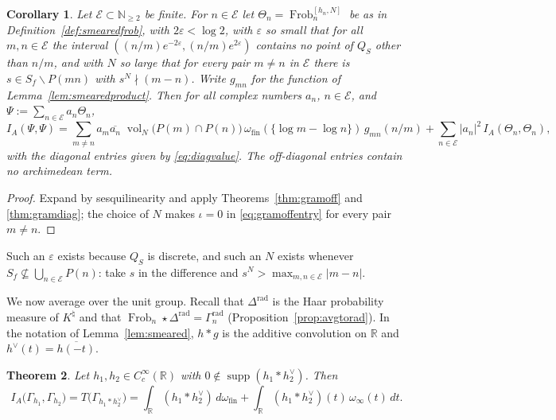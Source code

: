 \documentclass[11pt]{amsart}
\newtheorem{theorem}{Theorem}[section]
\newtheorem{corollary}[theorem]{Corollary}
\theoremstyle{definition}
\newcommand{\R}{\mathbb R}
\newcommand{\N}{\mathbb N}
\newcommand{\Frob}{\operatorname{Frob}}
\newcommand{\supp}{\operatorname{supp}}
\newcommand{\vol}{\operatorname{vol}}
\newcommand{\Knat}{K^{\natural}}
\begin{document}
\begin{corollary}\label{cor:onlyfinite}
Let $\mathcal E\subset\N_{\ge2}$ be finite. For
$n\in\mathcal E$ let $\Theta_n=\Frob_n^{[h_n,N]}$ be as in
Definition~\ref{def:smearedfrob}, with $2\varepsilon<\log2$, with $\varepsilon$ so small that for all
$m,n\in\mathcal E$ the interval $((n/m)e^{-2\varepsilon},(n/m)e^{2\varepsilon})$
contains no point of $Q_S$ other than $n/m$, and with $N$ so large that for
every pair $m\ne n$ in $\mathcal E$ there is $s\in S_f\smallsetminus P(mn)$ with
$s^N\nmid(m-n)$. Write $g_{mn}$ for the function of
Lemma~\ref{lem:smearedproduct}. Then for all complex numbers $a_n$, $n\in\mathcal E$,
and $\Psi:=\sum_{n\in\mathcal E}a_n\Theta_n$,
\begin{equation}\label{eq:gramtotal}
  I_A(\Psi,\Psi)=\sum_{m\ne n}a_m\overline{a_n}\;\vol_N\bigl(P(m)\cap P(n)\bigr)\,
    \omega_{\mathrm{fin}}(\{\log m-\log n\})\,g_{mn}(n/m)
   +\sum_{n\in\mathcal E}|a_n|^2\,I_A(\Theta_n,\Theta_n),
\end{equation}
with the diagonal entries given by \eqref{eq:diagvalue}. The off-diagonal
entries contain no archimedean term.
\end{corollary}

\begin{proof}
Expand by sesquilinearity and apply Theorems~\ref{thm:gramoff} and
\ref{thm:gramdiag}; the choice of $N$ makes $\iota=0$ in
\eqref{eq:gramoffentry} for every pair $m\ne n$.
\end{proof}

Such an $\varepsilon$ exists because $Q_S$ is discrete, and such an $N$
exists whenever $S_f\not\subseteq\bigcup_{n\in\mathcal E}P(n)$: take $s$ in the
difference and $s^N>\max_{m,n\in\mathcal E}|m-n|$.

We now average over the unit group. Recall that $\Delta^{\mathrm{rad}}$ is
the Haar probability measure of $\Knat$ and that
$\Frob_n\star\Delta^{\mathrm{rad}}=\Gamma_n^{\mathrm{rad}}$
(Proposition~\ref{prop:avgtorad}). In the notation of Lemma~\ref{lem:smeared},
$h*g$ is the additive convolution on $\R$ and
$h^\vee(t)=\overline{h(-t)}$.

\begin{theorem}\label{thm:fullweil}
Let $h_1,h_2\in C_c^\infty(\R)$ with $0\notin\supp(h_1*h_2^\vee)$. Then
\begin{equation}\label{eq:radgram}
  I_A\bigl(\Gamma_{h_1},\Gamma_{h_2}\bigr)
   =T\bigl(\Gamma_{h_1*h_2^\vee}\bigr)
   =\int_{\R}(h_1*h_2^\vee)\,d\omega_{\mathrm{fin}}
    +\int_{\R}(h_1*h_2^\vee)(t)\,\omega_\infty(t)\,dt .
\end{equation}
\end{theorem}
\end{document}
